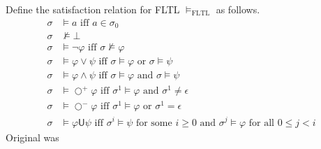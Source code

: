 \documentclass[a4paper]{article}
\newcommand{\U}{\mathsf{U}}
\newcommand{\tand}{\text{ and }}
\newcommand{\tor}{\text{ or }}
\newcommand{\tiff}{\text{ iff }}
\newcommand{\fsome}{\text{ for some }}
\newcommand{\fall}{\text{ for all }}
\newcommand{\sn}{\bigcirc^+}
\newcommand{\wn}{\bigcirc^-}
\newcommand{\ltlt}{LTL$_3$}
\begin{document}
\begin{defn}\label{fltlsemfull}

  Define the satisfaction relation for FLTL $\vDash_{\text{FLTL}}$ as follows.
  \begin{align*}
    \sigma &\vDash a \tiff a \in \sigma_0\\
    \sigma &\nvDash \bot\\
    \sigma &\vDash \neg \varphi \tiff \sigma \nvDash \varphi\\
    \sigma &\vDash \varphi \lor \psi \tiff \sigma \vDash \varphi \tor \sigma \vDash \psi\\
    \sigma &\vDash \varphi \land \psi \tiff \sigma \vDash \varphi \tand \sigma \vDash \psi\\
    \sigma&\vDash\sn\varphi \tiff \sigma^1\vDash\varphi \tand \sigma^1 \neq \epsilon\\
    \sigma&\vDash\wn\varphi \tiff \sigma^1\vDash\varphi \tor \sigma^1 = \epsilon\\
    \sigma &\vDash \varphi \U \psi \tiff \sigma^i \vDash \psi \fsome i \geq 0 \tand \sigma^j \vDash \varphi \fall 0 \leq j < i
  \end{align*}
  Original was 
\end{defn}

\end{document}
